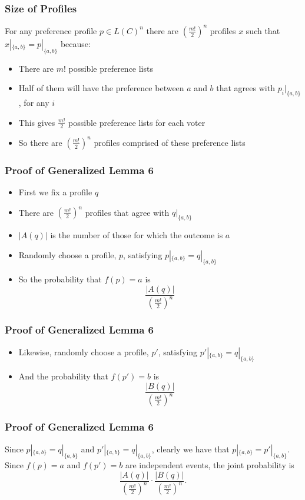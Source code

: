 \documentclass[aspectratio=169]{beamer}
\begin{document}
		\begin{frame}
			\frametitle{Size of Profiles}

			For any preference profile $p \in L(C)^n$ there are $(\frac{m!}{2})^n$ profiles $x$ such that $x|_{\{a, b\}} = p|_{\{a, b\}}$ because:

			\begin{itemize}
				\item There are $m!$ possible preference lists
				\item Half of them will have the preference between $a$ and $b$ that agrees with $p_i|_{\{a, b\}}$, for any $i$
				\item This gives $\frac{m!}{2}$ possible preference lists for each voter
				\item So there are $(\frac{m!}{2})^n$ profiles comprised of these preference lists
			\end{itemize}
		\end{frame}

		\begin{frame}
			\frametitle{Proof of Generalized Lemma 6}

			\begin{itemize}
				\item First we fix a profile $q$
				\item There are $(\frac{m!}{2})^n$ profiles that agree with $q|_{\{a,b\}}$
				\item $|A(q)|$ is the number of those for which the outcome is $a$
				\item Randomly choose a profile, $p$, satisfying $p|_{\{a,b\}} = q|_{\{a,b\}}$
				\item So the probability that $f(p) = a$ is
					\[
						\frac{|A(q)|}{\left(\frac{m!}{2}\right)^n}
					\]
			\end{itemize}
		\end{frame}

		\begin{frame}
			\frametitle{Proof of Generalized Lemma 6}

			\begin{itemize}
				\item Likewise, randomly choose a profile, $p'$, satisfying $p'|_{\{a,b\}} = q|_{\{a,b\}}$
				\item And the probability that $f(p') = b$ is
					\[
						\frac{|B(q)|}{\left(\frac{m!}{2}\right)^n}
					\]
			\end{itemize}
		\end{frame}

		\begin{frame}
			\frametitle{Proof of Generalized Lemma 6}

			Since $p|_{\{a,b\}} = q|_{\{a,b\}}$ and $p'|_{\{a,b\}} = q|_{\{a,b\}}$, clearly we have that $p|_{\{a,b\}} = p'|_{\{a,b\}}$. Since $f(p) = a$ and $f(p') = b$ are independent events, the joint probability is
			\[
				\frac{|A(q)|}{\left(\frac{m!}{2}\right)^n} \cdot \frac{|B(q)|}{\left(\frac{m!}{2}\right)^n}.
			\]
		\end{frame}
\end{document}
